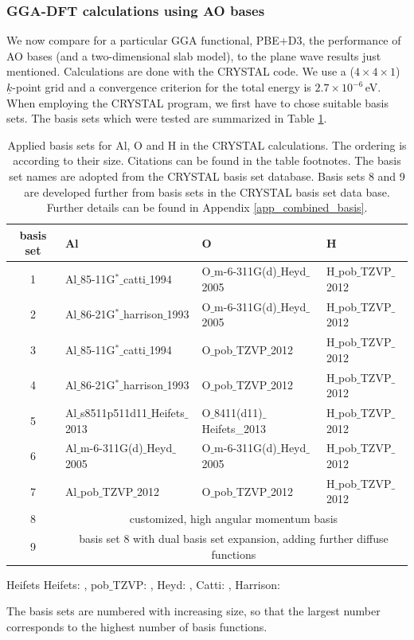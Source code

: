 \documentclass[11pt,DIV=13,BCOR=5mm,a4paper,headinclude]{scrbook}
\renewcommand{\vec}[1]{\underline{#1}}
\begin{document}
 \subsubsection{GGA-DFT calculations using AO bases}
We now compare for a particular GGA functional, PBE+D3, the performance of AO bases (and a two-dimensional slab model), to the plane wave results just mentioned.
Calculations are done with the CRYSTAL code.
We use a ($4\times 4 \times 1$) $\vec{k}$-point grid and a convergence criterion for the total energy is $2.7\times 10^{-6}\,$eV.
When employing the CRYSTAL program, we first have to chose suitable basis sets.
The basis sets which were tested are summarized in Table \ref{tab:basissets}.
\begin{table}[!h]
  \centering
   \caption{Applied basis sets for Al, O and H in the CRYSTAL calculations.
   The ordering is according to their size.
   Citations can be found in the table footnotes.
   The basis set names are adopted from the CRYSTAL basis set database.
   Basis sets 8 and 9 are developed further from basis sets in the CRYSTAL basis set data base.
   Further details can be found in Appendix \ref{app_combined_basis}.}
  \begin{tabular}{c|lll}
  \toprule
  basis set & Al & O & H \\\midrule
   1&Al$\_$85-11G$^\ast\_$catti$\_$1994 &O$\_$m-6-311G(d)$\_$Heyd$\_$2005 & H$\_$pob$\_$TZVP$\_$2012\\
   2&Al$\_$86-21G$^\ast\_$harrison$\_$1993 &O$\_$m-6-311G(d)$\_$Heyd$\_$2005 & H$\_$pob$\_$TZVP$\_$2012\\
   3&Al$\_$85-11G$^\ast\_$catti$\_$1994 &O$\_$pob$\_$TZVP$\_$2012 & H$\_$pob$\_$TZVP$\_$2012\\
   4&Al$\_$86-21G$^\ast\_$harrison$\_$1993 &O$\_$pob$\_$TZVP$\_$2012 & H$\_$pob$\_$TZVP$\_$2012\\
   5&Al$\_$s8511p511d11$\_$Heifets$\_$2013 & O$\_$8411(d11)$\_$Heifets\_2013&H$\_$pob$\_$TZVP$\_$2012 \\
   6&Al$\_$m-6-311G(d)$\_$Heyd$\_$2005 &O$\_$m-6-311G(d)$\_$Heyd$\_$2005 & H$\_$pob$\_$TZVP$\_$2012\\
   7&Al$\_$pob$\_$TZVP$\_$2012 &O$\_$pob$\_$TZVP$\_$2012 & H$\_$pob$\_$TZVP$\_$2012\\
   8&\multicolumn{3}{c}{customized, high angular momentum basis} \\
   9&\multicolumn{3}{c}{basis set 8 with dual basis set expansion, adding further diffuse functions}\\\bottomrule
  \end{tabular}
  \begin{tablenotes}
 \footnotesize
\item[Heifets] Heifets: \cite{heifets}, pob$\_$TZVP: \cite{pobTZVP}, Heyd: \cite{heyd1,heyd2}, Catti: \cite{catti}, Harrison: \cite{harrison1,harrison2}
\end{tablenotes}
  \label{tab:basissets}
\end{table}
The basis sets are numbered with increasing size, so that the largest number corresponds to the highest number of basis functions.
\end{document}
